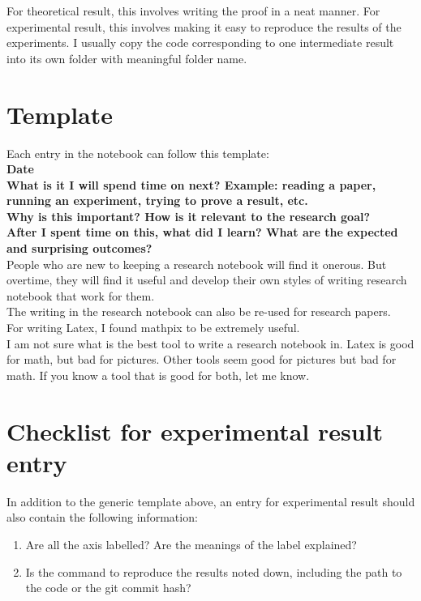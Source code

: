 \documentclass[11pt]{article}
\begin{document}
For theoretical result, this involves writing the proof in a neat manner. For experimental result, this involves making it easy to reproduce the results of the experiments. I usually copy the code corresponding to one intermediate result into its own folder with meaningful folder name.

\section{Template}

Each entry in the notebook can follow this template:
\\

\textbf{Date}
\\

\textbf{What is it I will spend time on next? Example: reading a paper, running an experiment, trying to prove a result, etc.}
\\

\textbf{Why is this important? How is it relevant to the research goal?}
\\

\textbf{After I spent time on this, what did I learn? What are the expected and surprising outcomes?}
\\

People who are new to keeping a research notebook will find it onerous. But overtime, they will find it useful and develop their own styles of writing research notebook that work for them.
\\

The writing in the research notebook can also be re-used for research papers.
\\

For writing Latex, I found mathpix to be extremely useful.
\\

I am not sure what is the best tool to write a research notebook in. Latex is good for math, but bad for pictures. Other tools seem good for pictures but bad for math. If you know a tool that is good for both, let me know.

\section{Checklist for experimental result entry}

In addition to the generic template above, an entry for experimental result should also contain the following information:

\begin{enumerate}
	\item Are all the axis labelled? Are the meanings of the label explained?
	\item Is the command to reproduce the results noted down, including the path to the code or the git commit hash?
\end{enumerate}
\end{document}
